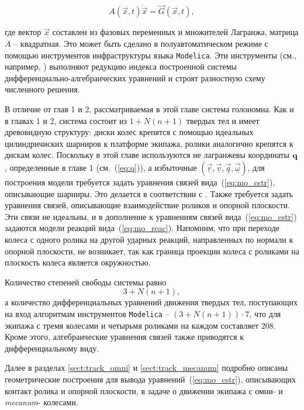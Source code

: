$$ A(\vec{x}, t)\dot{\vec{x}} = \vec{G}(\vec{x}, t), $$

где вектор $\vec{x}$ составлен из фазовых переменных и множителей Лагранжа, матрица $A$ -- квадратная.
Это может быть сделано в полуавтоматическом режиме с помощью инструментов инфраструктуры языка \texttt{Modelica}. Эти инструменты (см., например, \cite{Fritzson}) выполняют редукцию индекса построенной системы дифференциально-алгебраических уравнений и строят разностную схему численного решения.

В отличие от глав 1 и 2, рассматриваемая в этой главе система голономна. Как и в главах 1 и 2, система состоит из $1 + N(n+1)$ твердых тел и имеет древовидную структуру: диски колес крепятся с помощью идеальных цилиндричиских шарниров к платформе экипажа, ролики аналогично крепятся к дискам колес. Поскольку в этой главе используются не лагранжевы координаты $\mathbf{q}$, определенные в главе 1 (см.~(\ref{eq:q})), а избыточные $\left(\vec{\underline{r}}, \vec{\underline{v}}, \vec{\underline{q}}, \vec{\underline{\omega}}\right)$, для построения модели требуется задать уравнения связей вида~(\ref{eq:mo_cstr}), описывающие шарниры. Это делается в соответствии с \cite{KosenkoGraphs2009}. Также требуется задать уравнения связей, описывающие взаимодействие роликов и опорной плоскости. Эти связи не идеальны, и в дополнение к уравнениям связей вида~(\ref{eq:mo_cstr}) задаются модели реакций вида~(\ref{eq:mo_reac}). Напомним, что при переходе колеса с одного ролика на другой ударных реакций, направленных по нормали к опорной плоскости, не возникает, так как граница проекции колеса с роликами на плоскость колеса является окружностью.

Количество степеней свободы системы равно
$$ 3 + N(n + 1),$$
а количество дифференциальных уравнений движения твердых тел, поступающих на вход алгоритмам инструментов \texttt{Modelica} -- $(3 + N(n + 1)) \cdot 7$, что для экипажа с тремя колесами и четырьмя роликами на каждом составляет $208$. Кроме этого, алгебраические уравнения связей также приводятся к дифференциальному виду.

Далее в разделах \ref{sect:track_omni} и \ref{sect:track_mecanum} подробно описаны геометрические построения для вывода уравнений~(\ref{eq:mo_cstr}), описывающих контакт ролика и опорной плоскости, в задаче о движении экипажа с омни- и \textit{mecanum}- колесами.
